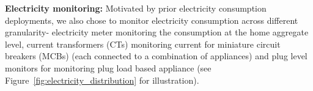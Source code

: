 \documentclass[10pt]{sensys-proc}
\newcommand{\figref}[1]{Figure~\ref{#1}}
\begin{document}
\noindent\textbf{Electricity monitoring:} %
Motivated by prior electricity consumption deployments, we also chose to monitor electricity consumption across different granularity- electricity meter monitoring the consumption at the home aggregate level, current transformers (CTs) monitoring current for miniature circuit breakers (MCBs) (each connected to a combination of appliances) and plug level monitors for monitoring plug load based appliance (see \figref{fig:electricity_distribution} for illustration). 
\end{document}
